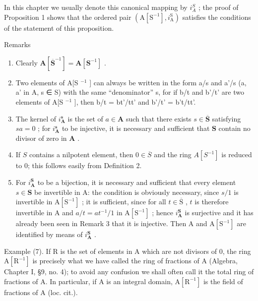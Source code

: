 In this chapter we usually denote this canonical mapping by \(i_{A}^{S}\) ; the proof of Proposition 1 shows that the ordered pair \((\mathrm{A}[\mathrm{S}^{-1}], i_{\mathrm{A}}^{\mathrm{S}})\) satisfies the conditions of the statement of this proposition.

Remarks

\begin{enumerate}
\def\labelenumi{(\arabic{enumi})}
\item
  Clearly \(\mathbf{A}[\overline{\mathbf{S}}^{-1}] = \mathbf{A}[\mathbf{S}^{-1}]\) .
\item
  Two elements of A{[}S \(^{-1}\) {]} can always be written in the form a/s and a'/s (a, a' in A, s ∈ S) with the same ``denominator'' s, for if b/t and b'/t' are two elements of A{[}S \(^{-1}\) {]}, then b/t = bt'/tt' and b'/t' = b't/tt'.
\item
  The kernel of \(i_{\mathbf{A}}^{\mathbf{s}}\) is the set of \(a \in \mathbf{A}\) such that there exists \(s \in \overline{\mathbf{S}}\) satisfying \(sa = 0\) ; for \(i_{\mathbf{A}}^{\mathbf{s}}\) to be injective, it is necessary and sufficient that \(\mathbf{S}\) contain no divisor of zero in \(\mathbf{A}\) .
\item
  If \(S\) contains a nilpotent element, then \(0 \in \overline{S}\) and the ring \(A[S^{-1}]\) is reduced to 0; this follows easily from Definition 2.
\item
  For \(i_{\mathbf{A}}^{\mathbf{S}}\) to be a bijection, it is necessary and sufficient that every element \(s \in \mathbf{S}\) be invertible in A: the condition is obviously necessary, since \(s/1\) is invertible in \(\mathrm{A}[\mathrm{S}^{-1}]\) ; it is sufficient, since for all \(t \in \overline{\mathrm{S}}\) , \(t\) is therefore invertible in A and \(a/t = at^{-1}/1\) in \(\mathrm{A}[\mathrm{S}^{-1}]\) ; hence \(i_{\mathbf{A}}^{\mathbf{S}}\) is surjective and it has already been seen in Remark 3 that it is injective. Then A and \(\mathrm{A}[\mathrm{S}^{-1}]\) are identified by means of \(i_{\mathbf{A}}^{\mathbf{S}}\) .
\end{enumerate}

Example (7). If R is the set of elements in A which are not divisors of 0, the ring \(\mathrm{A}[\mathrm{R}^{-1}]\) is precisely what we have called the ring of fractions of A (Algebra, Chapter I, §9, no. 4); to avoid any confusion we shall often call it the total ring of fractions of A. In particular, if A is an integral domain, \(\mathrm{A}[\mathrm{R}^{-1}]\) is the field of fractions of A (loc. cit.).

